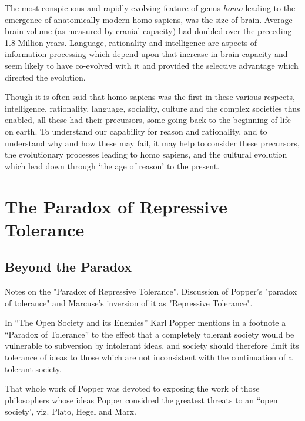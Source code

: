 \documentclass[10pt,titlepage]{book}
\begin{document}
The most conspicuous and rapidly evolving feature of genus \emph{homo} leading to the emergence of anatomically modern homo sapiens, was the size of brain.
Average brain volume (as measured by cranial capacity) had doubled over the preceding 1.8 Million years.
Language, rationality and intelligence are aspects of information processing which depend upon that increase in brain capacity and seem likely to have co-evolved with it and provided the selective advantage which directed the evolution.

Though it is often said that homo sapiens was the first in these various respects, intelligence, rationality, language, sociality, culture and the complex societies thus enabled, all these had their precursors, some going back to the beginning of life on earth.
To understand our capability for reason and rationality, and to understand why and how these may fail, it may help to consider these precursors, the evolutionary processes leading to homo sapiens, and the cultural evolution which lead down through `the age of reason' to the present.


\chapter{The Paradox of Repressive Tolerance}

\section{Beyond the Paradox}
 
Notes on the "Paradox of Repressive Tolerance".
Discussion of Popper's "paradox of tolerance" and Marcuse's inversion of it as "Repressive Tolerance".

In ``The Open Society and its Enemies'' Karl Popper mentions in a footnote a ``Paradox of Tolerance'' to the effect that a completely tolerant society would be vulnerable to subversion by intolerant ideas, and society should therefore limit its tolerance of ideas to those which are not inconsistent with the continuation of a tolerant society.

That whole work of Popper was devoted to exposing the work of those philosophers whose ideas Popper considred the greatest threats to an ``open society', viz. Plato, Hegel and Marx.
\end{document}
